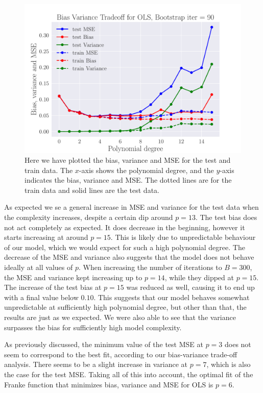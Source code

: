 \documentclass[reprint,english,notitlepage,aps,nobalancelastpage,nofootinbib]{revtex4-1}  %
\begin{document}
\begin{figure}[H]
	\includegraphics[width=\linewidth]{BVT_OLS_n30_eps0_2.pdf}
	\caption{Here we have plotted the bias, variance and MSE for the test and train data. The $x$-axis shows the polynomial degree, and the $y$-axis indicates the bias, variance and MSE. The dotted lines are for the train data and solid lines are the test data.}\label{fig:BV_OLS}
\end{figure}

As expected we se a general increase in MSE and variance for the test data when the complexity increases, despite a certain dip around $p=13$. The test bias does not act completely as expected. It does decrease in the beginning, however it starts increasing at around $p = 15$. This is likely due to unpredictable behaviour of our model, which we would expect for such a high polynomial degree. The decrease of the MSE and variance also suggests that the model does not behave ideally at all values of $p$. When increasing the number of iterations to $B=300$, the MSE and variance kept increasing up to $p=14$, while they dipped at $p=15$. The increase of the test bias at $p=15$ was reduced as well, causing it to end up with a final value below $0.10$. This suggests that our model behaves somewhat unpredictable at sufficiently high polynomial degree, but other than that, the results are just as we expected. We were also able to see that the variance surpasses the bias for sufficiently high model complexity.

As previously discussed, the minimum value of the test MSE at $p=3$ does not seem to correspond to the best fit, according to our bias-variance trade-off analysis. There seems to be a slight increase in variance at $p=7$, which is also the case for the test MSE. Taking all of this into account, the optimal fit of the Franke function that minimizes bias, variance and MSE for OLS is $p=6$.
\end{document}
